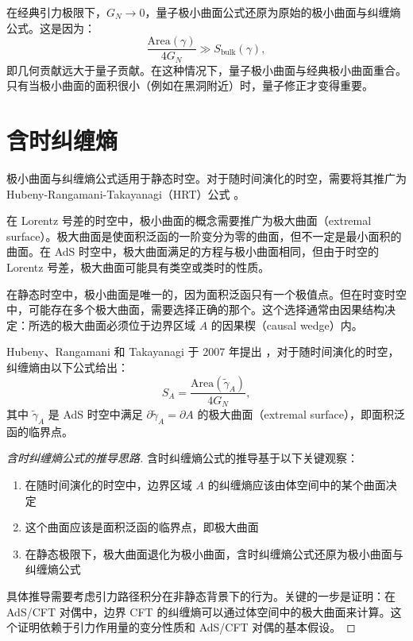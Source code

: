 \begin{note}[经典极限]
在经典引力极限下，$G_N \to 0$，量子极小曲面公式还原为原始的极小曲面与纠缠熵公式。这是因为：
\begin{equation}
    \frac{\text{Area}(\gamma)}{4G_N} \gg S_{\text{bulk}}(\gamma),
\end{equation}
即几何贡献远大于量子贡献。在这种情况下，量子极小曲面与经典极小曲面重合。只有当极小曲面的面积很小（例如在黑洞附近）时，量子修正才变得重要。
\end{note}

\section{含时纠缠熵}

极小曲面与纠缠熵公式适用于静态时空。对于随时间演化的时空，需要将其推广为 Hubeny-Rangamani-Takayanagi（HRT）公式 \cite{Hubeny2007}。

\begin{definition}[极大曲面]
在 Lorentz 号差的时空中，极小曲面的概念需要推广为极大曲面（extremal surface）。极大曲面是使面积泛函的一阶变分为零的曲面，但不一定是最小面积的曲面。在 AdS 时空中，极大曲面满足的方程与极小曲面相同，但由于时空的 Lorentz 号差，极大曲面可能具有类空或类时的性质。
\end{definition}

\begin{remark}[静态与时变背景的区别]
在静态时空中，极小曲面是唯一的，因为面积泛函只有一个极值点。但在时变时空中，可能存在多个极大曲面，需要选择正确的那个。这个选择通常由因果结构决定：所选的极大曲面必须位于边界区域 $A$ 的因果楔（causal wedge）内。
\end{remark}

\begin{theorem}[含时纠缠熵公式] \label{thm:HRT}
Hubeny、Rangamani 和 Takayanagi 于 2007 年提出 \cite{Hubeny2007}，对于随时间演化的时空，纠缠熵由以下公式给出：
\begin{equation}
    S_A = \frac{\text{Area}(\tilde{\gamma}_A)}{4 G_N},
    \label{eq:HRT}
\end{equation}
其中 $\tilde{\gamma}_A$ 是 AdS 时空中满足 $\partial \tilde{\gamma}_A = \partial A$ 的极大曲面（extremal surface），即面积泛函的临界点。
\end{theorem}

\begin{proof}[含时纠缠熵公式的推导思路]
含时纠缠熵公式的推导基于以下关键观察：
\begin{enumerate}
    \item 在随时间演化的时空中，边界区域 $A$ 的纠缠熵应该由体空间中的某个曲面决定
    \item 这个曲面应该是面积泛函的临界点，即极大曲面
    \item 在静态极限下，极大曲面退化为极小曲面，含时纠缠熵公式还原为极小曲面与纠缠熵公式
\end{enumerate}

具体推导需要考虑引力路径积分在非静态背景下的行为。关键的一步是证明：在 AdS/CFT 对偶中，边界 CFT 的纠缠熵可以通过体空间中的极大曲面来计算。这个证明依赖于引力作用量的变分性质和 AdS/CFT 对偶的基本假设。
\end{proof}

